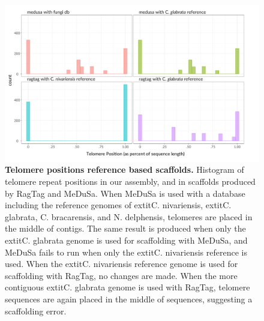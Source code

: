 \begin{figure}[!ht]
\centering
\includegraphics[width = 1\linewidth,keepaspectratio]{figure/telopos.pdf}
\caption[Telomere positions reference based scaffolds]{{\bf Telomere positions reference based scaffolds.} Histogram of telomere repeat positions in our assembly, and in scaffolds produced by RagTag and MeDuSa. When MeDuSa is used with a database including the reference genomes of 	extit{C. nivariensis}, 	extit{C. glabrata}, C. bracarensis, and N. delphensis, telomeres are placed in the middle of contigs. The same result is produced when only the 	extit{C. glabrata} genome is used for scaffolding with MeDuSa, and MeDuSa fails to run when only the 	extit{C. nivariensis} reference is used. When the 	extit{C. nivariensis} reference genome is used for scaffolding with RagTag, no changes are made. When the more contiguous 	extit{C. glabrata} genome is used with RagTag, telomere sequences are again placed in the middle of sequences, suggesting a scaffolding error.  }
\label{fig:telopos}
\end{figure}


